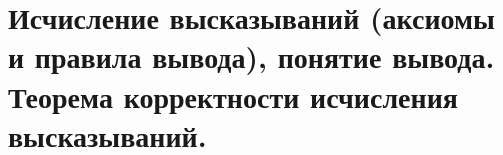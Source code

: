 \section{Исчисление высказываний (аксиомы и правила вывода), понятие вывода. Теорема корректности исчисления высказываний.}